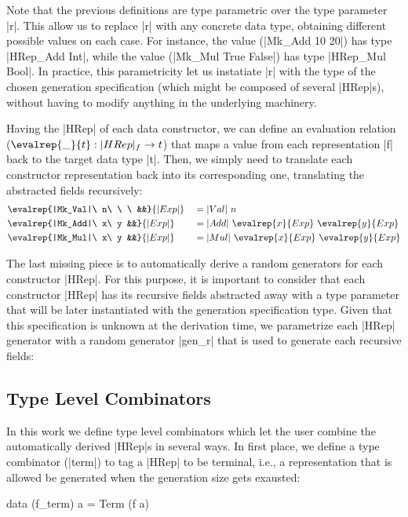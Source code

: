 Note that the previous definitions are type parametric over the type parameter
|r|.
%
This allow us to replace |r| with any concrete data type, obtaining different
possible values on each case.
%
For instance, the value (|Mk_Add 10 20|) has type |HRep_Add Int|, while the
value (|Mk_Mul True False|) has type |HRep_Mul Bool|.
%
In practice, this parametricity let us instatiate |r| with the type of the
chosen generation specification (which might be composed of several |HRep|s),
without having to modify anything in the underlying machinery.


Having the |HRep| of each data constructor, we can define an evaluation relation
($\evalrep{\_}{t} : |HRep|_f \rightarrow t$) that maps a value from each
representation |f| back to the target data type |t|.
%
Then, we simply need to translate each constructor representation back into its
corresponding one, translating the abstracted fields recursively:
%
\begin{alignat*}{4}
  &\evalrep{|Mk_Val|\ n\ \ \ &&}{|Exp|}
    &&= |Val|\ n \\
  &\evalrep{|Mk_Add|\ x\ y   &&}{|Exp|}
    &&= |Add|\ \evalrep{x}{Exp}\ \evalrep{y}{Exp} \\
  &\evalrep{|Mk_Mul|\ x\ y   &&}{|Exp|}
    &&= |Mul|\ \evalrep{x}{Exp}\ \evalrep{y}{Exp}
\end{alignat*}

The last missing piece is to automatically derive a random generators for each
constructor |HRep|.
%
For this purpose, it is important to consider that each constructor |HRep| has
its recursive fields abstracted away with a type parameter that will be later
instantiated with the generation specification type.
%
Given that this specification is unknown at the derivation time, we parametrize
each |HRep| generator with a random generator |gen_r| that is used to generate
each recursive fields:



\subsection*{\textbf{Type Level Combinators}}

In this work we define type level combinators which let the user combine the
automatically derived |HRep|s in several ways.
%
In first place, we define a type combinator (|term|) to tag a |HRep| to be
terminal, i.e., a representation that is allowed be generated when the
generation size gets exausted:
%
\begin{code}
data (f_term) a = Term (f a)
\end{code}

